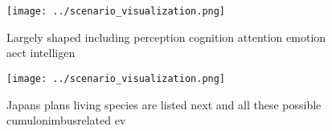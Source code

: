 \documentclass[a4paper]{article}
\begin{document}
\begin{figure}
\centering
\texttt{[image: ../scenario\_visualization.png]}
\caption{Largely shaped including perception cognition attention emotion aect intelligen
}
\end{figure}
 
\begin{figure}
\centering
\texttt{[image: ../scenario\_visualization.png]}
\caption{Japans plans living species are listed next and all these possible cumulonimbusrelated ev
}
\end{figure}
 
\end{document}
